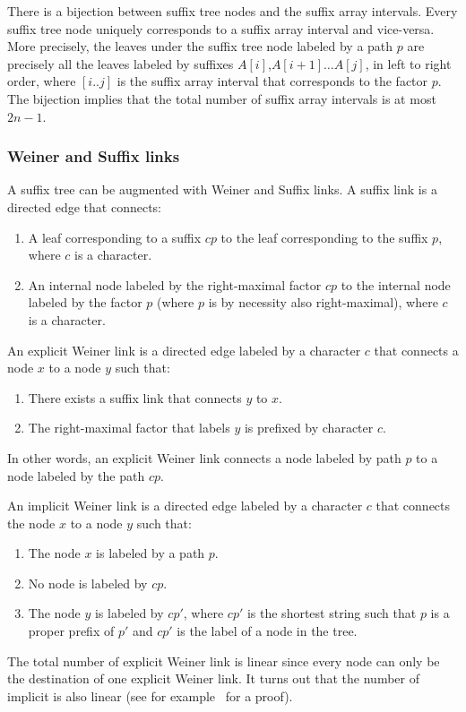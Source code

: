 \documentclass[a4paper]{article}
\begin{document}
There is a bijection between suffix tree nodes and the suffix array intervals. Every suffix tree node uniquely corresponds to a suffix array interval and vice-versa. More precisely, the leaves under the suffix tree node labeled by a path $p$ are precisely all the leaves labeled by suffixes $A[i]$,$A[i+1]\ldots A[j]$, in left to right order, where $[i..j]$ is the suffix array interval that corresponds to the factor $p$. 
The bijection implies that the total number of suffix array intervals is at most $2n-1$. 

\subsubsection{Weiner and Suffix links}
A suffix tree can be augmented with Weiner and Suffix links. 
A suffix link is a directed edge that connects: 
\begin{enumerate}
\item A leaf corresponding to a suffix $cp$ to the leaf corresponding to the suffix $p$, where $c$ is a character. 
\item An internal node labeled by the right-maximal factor $cp$ to the internal node labeled by the factor $p$ (where $p$ is by necessity also right-maximal), where $c$ is a character. 
\end{enumerate}

An explicit Weiner link is a directed edge labeled by a character $c$ that connects a node $x$ to a node $y$ such that:
\begin{enumerate}
\item There exists a suffix link that connects $y$ to $x$. 
\item The right-maximal factor that labels $y$ is prefixed by character $c$. 
\end{enumerate}
In other words, an explicit Weiner link connects a node labeled by path $p$ to a node labeled by 
the path $cp$. 

An implicit Weiner link is a directed edge labeled by a character $c$ that connects the node $x$ to a node $y$ such that: 
\begin{enumerate}
\item The node $x$ is labeled by a path $p$. 
\item No node is labeled by $cp$. 
\item The node $y$ is labeled by $cp'$, where $cp'$ is the shortest string such that $p$ is a proper 
prefix of $p'$ and $cp'$ is the label of a node in the tree. 
\end{enumerate}
The total number of explicit Weiner link is linear since every node can only be the destination of one explicit Weiner link. 
It turns out that the number of implicit is also linear (see for example~\cite{BNtalg14} for a proof). 
\end{document}
